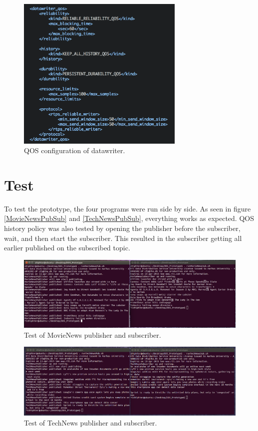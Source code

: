 \begin{figure}[ht!]
\centering
\includegraphics[width=80mm]{img/QOSProfiles.png}
\caption{QOS configuration of datawriter.}
\label{QOSProfiles}
\end{figure}

\section{Test}
To test the prototype, the four programs were run side by side. As seen in figure \ref{MovieNewsPubSub} and  \ref{TechNewsPubSub}, everything works as expected. QOS history policy was also tested by opening the publisher before the subscriber, wait, and then start the subscriber. This resulted in the subscriber getting all earlier published on the subscribed topic.

\begin{figure}[ht!]
\centering
\includegraphics[width=150mm]{img/MovieNewsPubSub.png}
\caption{Test of MovieNews publisher and subscriber.}
\label{QOSProfiles}
\end{figure}

\begin{figure}[ht!]
\centering
\includegraphics[width=150mm]{img/TechNewsPubSub.png}
\caption{Test of TechNews publisher and subscriber.}
\label{QOSProfiles}
\end{figure}
